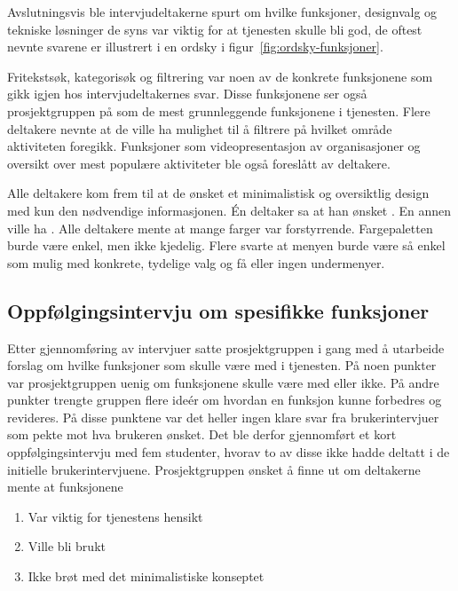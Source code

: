 Avslutningsvis ble intervjudeltakerne spurt om hvilke funksjoner, designvalg og tekniske løsninger de syns var viktig for at tjenesten skulle bli god, de oftest nevnte svarene er illustrert i en ordsky i figur~\ref{fig:ordsky-funksjoner}. 

Fritekstsøk, kategorisøk og filtrering var noen av de konkrete funksjonene som gikk igjen hos intervjudeltakernes svar. Disse funksjonene ser også prosjektgruppen på som de mest grunnleggende funksjonene i tjenesten. Flere deltakere nevnte at de ville ha mulighet til å filtrere på hvilket område aktiviteten foregikk. Funksjoner som videopresentasjon av organisasjoner og oversikt over mest populære aktiviteter ble også foreslått av deltakere.

Alle deltakere kom frem til at de ønsket et minimalistisk og oversiktlig design med kun den nødvendige informasjonen. Én deltaker sa at han ønsket . En annen ville ha . Alle deltakere mente at mange farger var forstyrrende. Fargepaletten burde være enkel, men ikke kjedelig. Flere svarte at menyen burde være så enkel som mulig med konkrete, tydelige valg og få eller ingen undermenyer.

\subsection{Oppfølgingsintervju om spesifikke funksjoner}
Etter gjennomføring av intervjuer satte prosjektgruppen i gang med å utarbeide forslag om hvilke funksjoner som skulle være med i tjenesten. På noen punkter var prosjektgruppen uenig om funksjonene skulle være med eller ikke. På andre punkter trengte gruppen flere ideér om hvordan en funksjon kunne forbedres og revideres. På disse punktene var det heller ingen klare svar fra brukerintervjuer som pekte mot hva brukeren ønsket. Det ble derfor gjennomført et kort oppfølgingsintervju med fem studenter, hvorav to av disse ikke hadde deltatt i de initielle brukerintervjuene. Prosjektgruppen ønsket å finne ut om deltakerne mente at funksjonene

\begin{enumerate}
\item Var viktig for tjenestens hensikt
\item Ville bli brukt
\item Ikke brøt med det minimalistiske konseptet
\end{enumerate}

